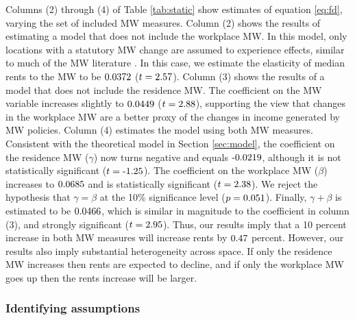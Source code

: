 Columns (2) through (4) of Table \ref{tab:static} show estimates of equation 
\eqref{eq:fd}, varying the set of included MW measures.
Column (2) shows the results of estimating a model that does not include the 
workplace MW.
In this model, only locations with a statutory MW change are assumed to 
experience effects, similar to much of the MW literature 
\parencite[e.g.,][]{DubeEtAl2010, MeerWest2016, Yamagishi2021}.
In this case, we estimate the elasticity of median rents to the MW to be 
$\textnormal{0.0372}$ ($t=\textnormal{2.57}$).
Column (3) shows the results of a model that does not include the residence MW.
The coefficient on the MW variable increases slightly to 
$\textnormal{0.0449}$ ($t=\textnormal{2.88}$), 
supporting the view that changes in the workplace MW are a better proxy of 
the changes in income generated by MW policies.
Column (4) estimates the model using both MW measures.
Consistent with the theoretical model in Section \ref{sec:model}, the 
coefficient on the residence MW ($\gamma$) now turns negative and equals 
$\textnormal{-0.0219}$, although it is not statistically significant 
($t=\textnormal{-1.25}$).
The coefficient on the workplace MW ($\beta$) increases to $\textnormal{0.0685}$ and 
is statistically significant ($t=\textnormal{2.38}$).
We reject the hypothesis that $\gamma=\beta$ at the 10\% significance level 
($p = \textnormal{0.051}$).
Finally, $\gamma+\beta$ is estimated to be $\textnormal{0.0466}$, which is similar 
in magnitude to the coefficient in column (3), and strongly 
significant ($t=\textnormal{2.95}$).
Thus, our results imply that a 10 percent increase in both MW measures will 
increase rents by $\textnormal{0.47}$ percent.
However, our results also imply substantial heterogeneity across space.
If only the residence MW increases then rents are expected to decline,
and if only the workplace MW goes up then the rents increase will be larger.

\subsubsection*{Identifying assumptions}

